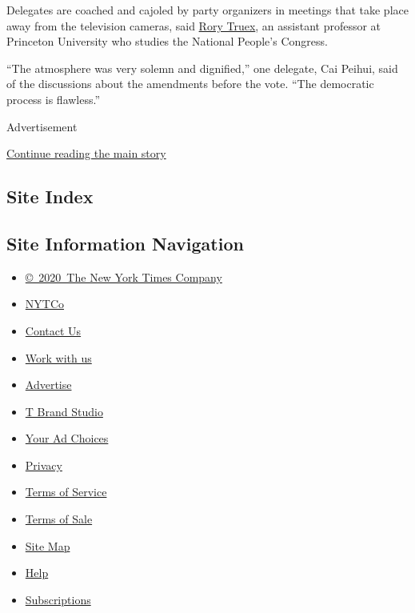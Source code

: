Delegates are coached and cajoled by party organizers in meetings that
take place away from the television cameras, said
\href{http://wws.princeton.edu/faculty-research/faculty/rtruex}{Rory
Truex}, an assistant professor at Princeton University who studies the
National People's Congress.

``The atmosphere was very solemn and dignified,'' one delegate, Cai
Peihui, said of the discussions about the amendments before the vote.
``The democratic process is flawless.''

Advertisement

\protect\hyperlink{after-bottom}{Continue reading the main story}

\hypertarget{site-index}{%
\subsection{Site Index}\label{site-index}}

\hypertarget{site-information-navigation}{%
\subsection{Site Information
Navigation}\label{site-information-navigation}}

\begin{itemize}
\tightlist
\item
  \href{https://help.nytimes3xbfgragh.onion/hc/en-us/articles/115014792127-Copyright-notice}{©~2020~The
  New York Times Company}
\end{itemize}

\begin{itemize}
\tightlist
\item
  \href{https://www.nytco.com/}{NYTCo}
\item
  \href{https://help.nytimes3xbfgragh.onion/hc/en-us/articles/115015385887-Contact-Us}{Contact
  Us}
\item
  \href{https://www.nytco.com/careers/}{Work with us}
\item
  \href{https://nytmediakit.com/}{Advertise}
\item
  \href{http://www.tbrandstudio.com/}{T Brand Studio}
\item
  \href{https://www.nytimes3xbfgragh.onion/privacy/cookie-policy\#how-do-i-manage-trackers}{Your
  Ad Choices}
\item
  \href{https://www.nytimes3xbfgragh.onion/privacy}{Privacy}
\item
  \href{https://help.nytimes3xbfgragh.onion/hc/en-us/articles/115014893428-Terms-of-service}{Terms
  of Service}
\item
  \href{https://help.nytimes3xbfgragh.onion/hc/en-us/articles/115014893968-Terms-of-sale}{Terms
  of Sale}
\item
  \href{https://spiderbites.nytimes3xbfgragh.onion}{Site Map}
\item
  \href{https://help.nytimes3xbfgragh.onion/hc/en-us}{Help}
\item
  \href{https://www.nytimes3xbfgragh.onion/subscription?campaignId=37WXW}{Subscriptions}
\end{itemize}
